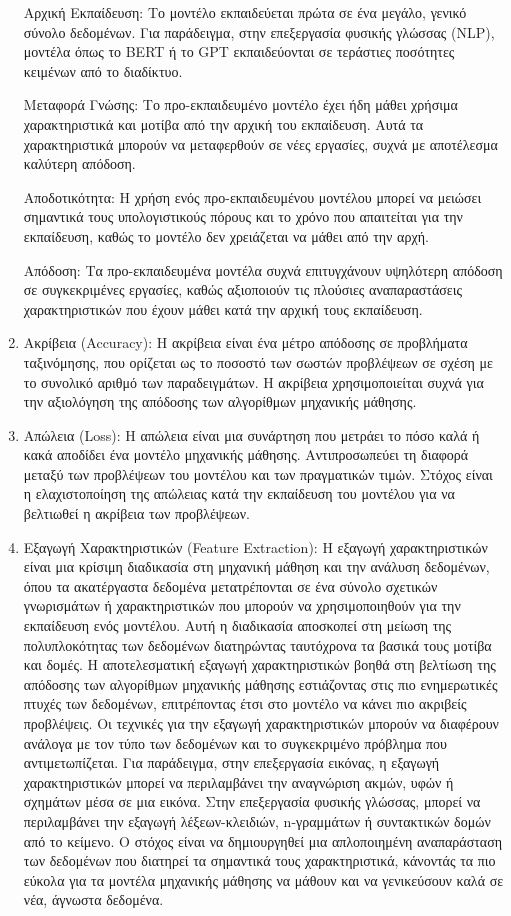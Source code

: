 \begin{enumerate}
    Αρχική Εκπαίδευση: Το μοντέλο εκπαιδεύεται πρώτα σε ένα μεγάλο, γενικό σύνολο δεδομένων. Για παράδειγμα, στην επεξεργασία φυσικής γλώσσας (NLP), μοντέλα όπως το BERT ή το GPT εκπαιδεύονται σε τεράστιες ποσότητες κειμένων από το διαδίκτυο.
    
    Μεταφορά Γνώσης: Το προ-εκπαιδευμένο μοντέλο έχει ήδη μάθει χρήσιμα χαρακτηριστικά και μοτίβα από την αρχική του εκπαίδευση. Αυτά τα χαρακτηριστικά μπορούν να μεταφερθούν σε νέες εργασίες, συχνά με αποτέλεσμα καλύτερη απόδοση.
    
    Αποδοτικότητα: Η χρήση ενός προ-εκπαιδευμένου μοντέλου μπορεί να μειώσει σημαντικά τους υπολογιστικούς πόρους και το χρόνο που απαιτείται για την εκπαίδευση, καθώς το μοντέλο δεν χρειάζεται να μάθει από την αρχή.
    
    Απόδοση: Τα προ-εκπαιδευμένα μοντέλα συχνά επιτυγχάνουν υψηλότερη απόδοση σε συγκεκριμένες εργασίες, καθώς αξιοποιούν τις πλούσιες αναπαραστάσεις χαρακτηριστικών που έχουν μάθει κατά την αρχική τους εκπαίδευση.

    \item Ακρίβεια (Accuracy): Η ακρίβεια είναι ένα μέτρο απόδοσης σε προβλήματα ταξινόμησης, που ορίζεται ως το ποσοστό των σωστών προβλέψεων σε σχέση με το συνολικό αριθμό των παραδειγμάτων. Η ακρίβεια χρησιμοποιείται συχνά για την αξιολόγηση της απόδοσης των αλγορίθμων μηχανικής μάθησης. 

    \item Απώλεια (Loss): Η απώλεια είναι μια συνάρτηση που μετράει το πόσο καλά ή κακά αποδίδει ένα μοντέλο μηχανικής μάθησης. Αντιπροσωπεύει τη διαφορά μεταξύ των προβλέψεων του μοντέλου και των πραγματικών τιμών. Στόχος είναι η ελαχιστοποίηση της απώλειας κατά την εκπαίδευση του μοντέλου για να βελτιωθεί η ακρίβεια των προβλέψεων. 

    \item Εξαγωγή Χαρακτηριστικών (Feature Extraction): Η εξαγωγή χαρακτηριστικών είναι μια κρίσιμη διαδικασία στη μηχανική μάθηση και την ανάλυση δεδομένων, όπου τα ακατέργαστα δεδομένα μετατρέπονται σε ένα σύνολο σχετικών γνωρισμάτων ή χαρακτηριστικών που μπορούν να χρησιμοποιηθούν για την εκπαίδευση ενός μοντέλου. Αυτή η διαδικασία αποσκοπεί στη μείωση της πολυπλοκότητας των δεδομένων διατηρώντας ταυτόχρονα τα βασικά τους μοτίβα και δομές. Η αποτελεσματική εξαγωγή χαρακτηριστικών βοηθά στη βελτίωση της απόδοσης των αλγορίθμων μηχανικής μάθησης εστιάζοντας στις πιο ενημερωτικές πτυχές των δεδομένων, επιτρέποντας έτσι στο μοντέλο να κάνει πιο ακριβείς προβλέψεις. Οι τεχνικές για την εξαγωγή χαρακτηριστικών μπορούν να διαφέρουν ανάλογα με τον τύπο των δεδομένων και το συγκεκριμένο πρόβλημα που αντιμετωπίζεται. Για παράδειγμα, στην επεξεργασία εικόνας, η εξαγωγή χαρακτηριστικών μπορεί να περιλαμβάνει την αναγνώριση ακμών, υφών ή σχημάτων μέσα σε μια εικόνα. Στην επεξεργασία φυσικής γλώσσας, μπορεί να περιλαμβάνει την εξαγωγή λέξεων-κλειδιών, n-γραμμάτων ή συντακτικών δομών από το κείμενο. Ο στόχος είναι να δημιουργηθεί μια απλοποιημένη αναπαράσταση των δεδομένων που διατηρεί τα σημαντικά τους χαρακτηριστικά, κάνοντάς τα πιο εύκολα για τα μοντέλα μηχανικής μάθησης να μάθουν και να γενικεύσουν καλά σε νέα, άγνωστα δεδομένα.


\end{enumerate}
